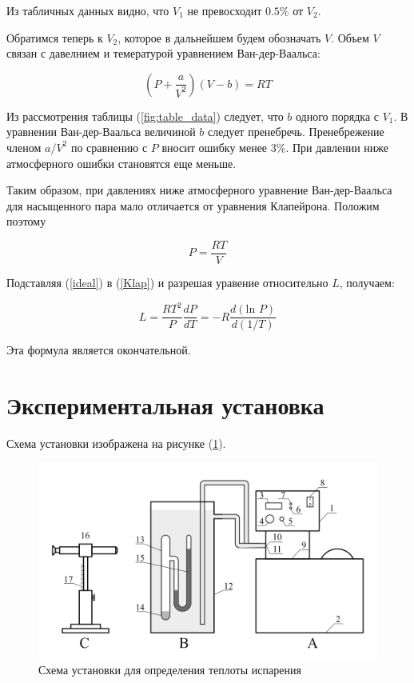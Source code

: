 \documentclass[a4paper,12pt]{article} %
\begin{document}
Из табличных данных видно, что $V_1$ не превосходит $0.5\%$ от $V_2$. 

\medskip

Обратимся теперь к $V_2$, которое в дальнейшем будем обозначать $V$. 
Объем $V$ связан с давелнием и темературой уравнением Ван-дер-Ваальса:

\begin{equation}
    \label{Van-der}
    \left( P + \frac{a}{V^2}\right)(V - b) = RT
\end{equation}

Из рассмотрения таблицы (\ref{fig:table_data}) следует, что $b$ одного порядка с $V_1$. 
В уравнении Ван-дер-Ваальса величиной $b$ следует пренебречь. Пренебрежение членом $a/V^2$ 
по сравнению с $P$ вносит ошибку менее 3\%. 
При давлении ниже атмосферного ошибки становятся еще меньше. 

Таким образом, при давлениях ниже атмосферного уравнение Ван-дер-Ваальса для насыщенного пара 
мало отличается от уравнения Клапейрона. Положим поэтому

\begin{equation}
    \label{ideal}
    P = \frac{RT}{V}
\end{equation}

Подставляя (\ref{ideal}) в (\ref{Klap}) и разрешая уравение относительно $L$, получаем:

\begin{equation}
    \label{L}
    L = \frac{RT^2}{P}\frac{dP}{dT} = -R\frac{d(\mbox{ln }P)}{d(1/T)}
\end{equation}

Эта формула является окончательной.

\section*{Экспериментальная установка}

Схема установки изображена на рисунке (\ref{fig:drawing2}). 

\begin{figure}[h]
  \centering
  \includegraphics[scale = 0.5]{drawing2.png}
  \caption{Схема установки для определения теплоты испарения}
  \label{fig:drawing2}
\end{figure}
\end{document}
